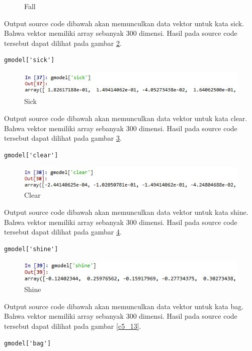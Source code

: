 \begin{enumerate}
\begin{figure}[!htbp]
\caption{Fall}
\label{c5_9}
\end{figure}
\subitem Output source code dibawah akan memunculkan data vektor untuk kata sick. Bahwa vektor memiliki array sebanyak 300 dimensi. Hasil pada source code tersebut dapat dilihat pada gambar \ref{c5_10}.
\begin{verbatim}
gmodel['sick']
\end{verbatim}
\begin{figure}[!htbp]
\centerline{\includegraphics[width=1\textwidth]{figures/c5p/10.JPG}}
\caption{Sick}
\label{c5_10}
\end{figure}
\subitem Output source code dibawah akan memunculkan data vektor untuk kata clear. Bahwa vektor memiliki array sebanyak 300 dimensi. Hasil pada source code tersebut dapat dilihat pada gambar \ref{c5_11}.
\begin{verbatim}
gmodel['clear']
\end{verbatim}
\begin{figure}[!htbp]
\centerline{\includegraphics[width=1\textwidth]{figures/c5p/11.JPG}}
\caption{Clear}
\label{c5_11}
\end{figure}
\subitem Output source code dibawah akan memunculkan data vektor untuk kata shine. Bahwa vektor memiliki array sebanyak 300 dimensi. Hasil pada source code tersebut dapat dilihat pada gambar \ref{c5_12}.
\begin{verbatim}
gmodel['shine']
\end{verbatim}
\begin{figure}[!htbp]
\centerline{\includegraphics[width=1\textwidth]{figures/c5p/12.JPG}}
\caption{Shine}
\label{c5_12}
\end{figure}
\subitem Output source code dibawah akan memunculkan data vektor untuk kata bag. Bahwa vektor memiliki array sebanyak 300 dimensi. Hasil pada source code tersebut dapat dilihat pada gambar \ref{c5_13}.
\begin{verbatim}
gmodel['bag']
\end{verbatim}

\end{enumerate}
